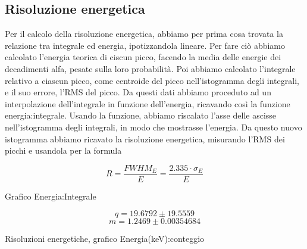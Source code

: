 \subsection{Risoluzione energetica}
\FloatBarrier
Per il calcolo della risoluzione energetica, abbiamo per prima cosa trovata la relazione tra integrale ed energia, ipotizzandola lineare. 
Per fare ciò abbiamo calcolato l'energia teorica di ciscun picco, facendo la media delle energie dei decadimenti alfa, pesate sulla loro probabilità. 
Poi abbiamo calcolato l'integrale relativo a ciascun picco, come centroide del picco nell'istogramma degli integrali, e il suo errore, l'RMS del picco.
Da questi dati abbiamo proceduto ad un interpolazione dell'integrale in funzione dell'energia, ricavando così la funzione energia:integrale. 
Usando la funzione, abbiamo riscalato l'asse delle ascisse nell'istogramma degli integrali, in modo che mostrasse l'energia. 
Da questo nuovo istogramma abbiamo ricavato la risoluzione energetica, misurando l'RMS dei picchi e usandola per la formula

\begin{equation}
 R=\frac{FWHM_E}{E}=\frac{2.335\cdot\sigma_E}{E}
\end{equation}

\begin{grafico}[H]
 \centering
 \resizebox{\textwidth}{!}{%
 
 }%
 \caption{Grafico Energia:Integrale} 
 \label{gr:energy_integral.tex} 
\end{grafico}

\FloatBarrier
$$q=19.6792\pm19.5559$$
$$m=1.2469\pm0.00354684$$


\begin{grafico}
 \centering
 \caption{Risoluzioni energetiche, grafico Energia(keV):conteggio} 
 \label{gr:600_energy.tex} 
\end{grafico}

\FloatBarrier